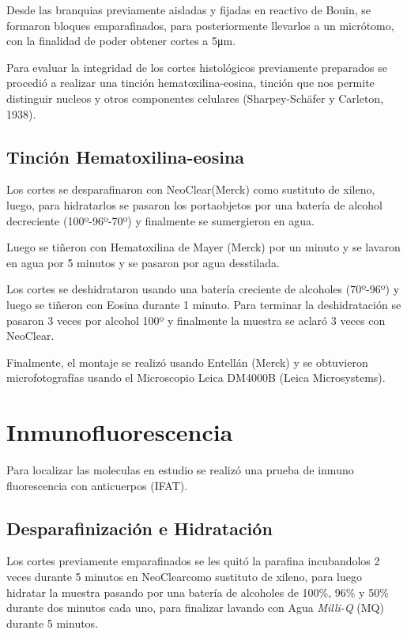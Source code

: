 \documentclass[12pt,letterpaper,oneside]{scrbook}
\begin{document}
Desde las branquias previamente aisladas y fijadas en reactivo de Bouin,
se formaron bloques emparafinados, para posteriormente llevarlos a un
micrótomo, con la finalidad de poder obtener cortes a
5\si{\micro\meter}.

Para evaluar la integridad de los cortes histológicos previamente
preparados se procedió a realizar una tinción hematoxilina-eosina,
tinción que nos permite distinguir nucleos y otros componentes celulares
(Sharpey-Schäfer y Carleton, 1938).

\subsection{Tinción Hematoxilina-eosina}

Los cortes se desparafinaron con NeoClear\textregistered (Merck) como
sustituto de xileno, luego, para hidratarlos se pasaron los portaobjetos
por una batería de alcohol decreciente (100º-96º-70º) y finalmente se
sumergieron en agua.

Luego se tiñeron con Hematoxilina de Mayer (Merck) por un minuto y se
lavaron en agua por 5 minutos y se pasaron por agua desstilada.

Los cortes se deshidrataron usando una batería creciente de alcoholes
(70º-96º) y luego se tiñeron con Eosina durante 1 minuto. Para terminar
la deshidratación se pasaron 3 veces por alcohol 100º y finalmente la
muestra se aclaró 3 veces con NeoClear\textregistered.

Finalmente, el montaje se realizó usando Entellán (Merck) y se
obtuvieron microfotografías usando el Microscopio Leica DM4000B (Leica
Microsystems).

\section{Inmunofluorescencia}\label{sec:ifat}

Para localizar las moleculas en estudio se realizó una prueba de inmuno
fluorescencia con anticuerpos (IFAT).

\subsection{Desparafinización e Hidratación}

Los cortes previamente emparafinados se les quitó la parafina
incubandolos 2 veces durante 5 minutos en NeoClear\textregistered como
sustituto de xileno, para luego hidratar la muestra pasando por una
batería de alcoholes de 100\%, 96\% y 50\% durante dos minutos cada uno,
para finalizar lavando con Agua \emph{Milli-Q} (MQ) durante 5 minutos.
\end{document}

